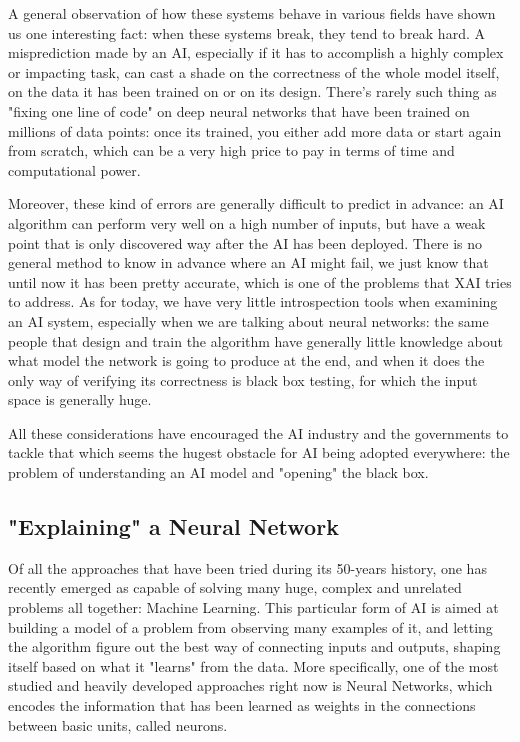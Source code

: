 \documentclass[conference]{IEEEtran}
\begin{document}
A general observation of how these systems behave in various fields have shown
us one interesting fact: when these systems break, they tend to break hard. A
misprediction made by an AI, especially if it has to accomplish a highly complex
or impacting task, can cast a shade on the correctness of the whole model
itself, on the data it has been trained on or on its design. There's rarely such
thing as "fixing one line of code" on deep neural networks that have been
trained on millions of data points: once its trained, you either add more data
or start again from scratch, which can be a very high price to pay in terms of
time and computational power.

Moreover, these kind of errors are generally difficult to predict in advance: an
AI algorithm can perform very well on a high number of inputs, but have a weak
point that is only discovered way after the AI has been deployed. There is no
general method to know in advance where an AI might fail, we just know that
until now it has been pretty accurate, which is one of the problems that XAI
tries to address. As for today, we have very little introspection tools when
examining an AI system, especially when we are talking about neural networks:
the same people that design and train the algorithm have generally little
knowledge about what model the network is going to produce at the end, and when
it does the only way of verifying its correctness is black box testing, for
which the input space is generally huge.

All these considerations have encouraged the AI industry and the governments to
tackle that which seems the hugest obstacle for AI being adopted everywhere: the
problem of understanding an AI model and "opening" the black box.

\subsection{"Explaining" a Neural Network}
\label{sec:explainingnn}

Of all the approaches that have been tried during its 50-years history, one has
recently emerged as capable of solving many huge, complex and unrelated problems
all together: Machine Learning. This particular form of AI is aimed at building
a model of a problem from observing many examples of it, and letting the
algorithm figure out the best way of connecting inputs and outputs, shaping
itself based on what it "learns" from the data. More specifically, one of the
most studied and heavily developed approaches right now is Neural Networks,
which encodes the information that has been learned as weights in the
connections between basic units, called neurons.
\end{document}
